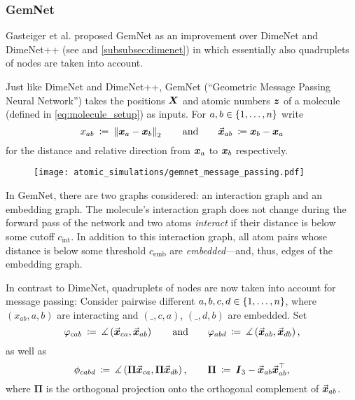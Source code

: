 \subsubsection{GemNet}
\label{subsubsec:gemnet}

Gasteiger et al. proposed GemNet \cite{https://doi.org/10.48550/arxiv.2106.08903} 
as an improvement over DimeNet and DimeNet++ (see 
\cite{DBLP:journals/corr/abs-2003-03123, https://doi.org/10.48550/arxiv.2011.14115} 
and \ref{subsubsec:dimenet}) in which essentially also quadruplets of nodes are
taken into account. 

Just like DimeNet and DimeNet++, GemNet (\enquote{Geometric Message Passing Neural Network}) 
takes the positions $\boldsymbol{X}$ and atomic numbers $\boldsymbol{z}$ of a molecule 
(defined in \eqref{eq:molecule_setup}) as inputs. For $a, b \in \left\{1, \dots, n\right\}$ write
\[
    x_{ab} \: \coloneqq \: \left\lVert\boldsymbol{x}_a - \boldsymbol{x}_b\right\rVert_2 
    \qquad \text{and} \qquad 
    \vec{\boldsymbol{x}}_{ab} \: \coloneqq \boldsymbol{x}_b - \boldsymbol{x}_a
\]
for the distance and relative direction from $\boldsymbol{x}_a$ to $\boldsymbol{x}_b$ respectively.
\begin{wrapfigure}{r}{0.3\textwidth}
    \centering
    \texttt{[image: atomic\_simulations/gemnet\_message\_passing.pdf]}
\end{wrapfigure}
In GemNet, there are two graphs considered: an interaction graph and an embedding graph.
The molecule's interaction graph does not change during the forward pass of the network and 
two atoms \textit{interact} if their distance is below some 
cutoff $c_{\text{int}}$. In addition to this interaction graph, all atom pairs 
whose distance is below some threshold $c_{\text{emb}}$ are \textit{embedded}---and, thus, 
edges of the embedding graph.

In contrast to DimeNet, quadruplets of nodes are now taken into account for message passing: 
Consider pairwise different $a, b, c, d \in \left\{1, \dots, n\right\}$,
where $(x_{ab}, a, b)$ are interacting and $(\_, c, a)$, $(\_, d, b)$ are
embedded. Set
\[
    \varphi_{cab} \: \coloneqq \: 
    \measuredangle \left( \vec{\boldsymbol{x}}_{ca}, \vec{\boldsymbol{x}}_{ab} \right)
    \qquad \text{and} \qquad
    \varphi_{abd} \: \coloneqq \: 
    \measuredangle \left( \vec{\boldsymbol{x}}_{ab}, \vec{\boldsymbol{x}}_{db} \right) \text{,}
\]
as well as 
\[
    \phi_{cabd} \: \coloneqq \: 
    \measuredangle \left( \boldsymbol{\Pi} \vec{\boldsymbol{x}}_{ca}, \boldsymbol{\Pi} \vec{\boldsymbol{x}}_{db} \right),
    \qquad \boldsymbol{\Pi} \: \coloneqq \: 
    \boldsymbol{I}_3 - \vec{\boldsymbol{x}}_{ab} \vec{\boldsymbol{x}}_{ab}^\top \text{,}
\]
where $\boldsymbol{\Pi}$ is the orthogonal projection onto the orthogonal
complement of $\vec{\boldsymbol{x}}_{ab}$.

